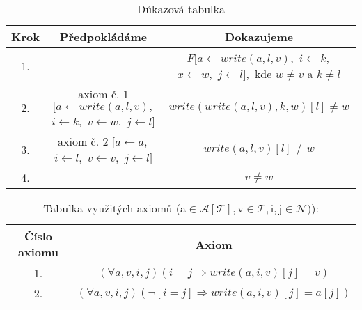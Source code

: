 \documentclass{article}
\begin{document}
\begin{table}[H]\centering

    \caption{Důkazová tabulka}

\begin{tabular}{|c|c|c|}
    
    
        \hline \textbf{Krok} & \textbf{Předpokládáme} & \textbf{Dokazujeme} \\ \hline \hline
    	1. & & \makecell{$F[a \leftarrow write(a,l,v),$ \\ $ i \leftarrow k,$ \\ $x \leftarrow w,$ \\ $j \leftarrow l],$ \\ kde $w \neq v$ a $k \neq l$}  \\ \hline
    	2. & \makecell{axiom č. 1 \\ $[a \leftarrow write(a,l,v),$ \\ $ i \leftarrow k,$ \\ $v \leftarrow w,$ \\ $j \leftarrow l]$} & $write(write(a,l,v),k,w)[l] \neq w$ \\ \hline
    	3. & \makecell{axiom č. 2 \\ $[a \leftarrow a,$ \\ $ i \leftarrow l,$ \\ $v \leftarrow v,$ \\ $j \leftarrow l]$} & $write(a,l,v)[l] \neq w$ \\ \hline
    	4. & & $v \neq w $ \\ \hline
    	
    	\end{tabular}
\end{table}

\begin{table}[H]\centering

    \caption{Tabulka využitých axiomů ($\mathrm{a} \in \mathcal{A[T]}, \mathrm{v} \in \mathcal{T}, \mathrm{i, j} \in  \mathcal{N} )$):}

\begin{tabular}{|c|c|}
    
    
        \hline \textbf{Číslo axiomu} & \textbf{Axiom} \\ \hline \hline
    	1. & $(\forall a, v, i, j) ( i = j \Rightarrow write(a, i, v)[j] = v)$ \\ \hline
    	2. & $(\forall a, v, i, j ) ( \neg [i = j] \Rightarrow write(a, i, v)[j] = a[j])$ \\ \hline
    	
    	\end{tabular}
\end{table}
\end{document}
